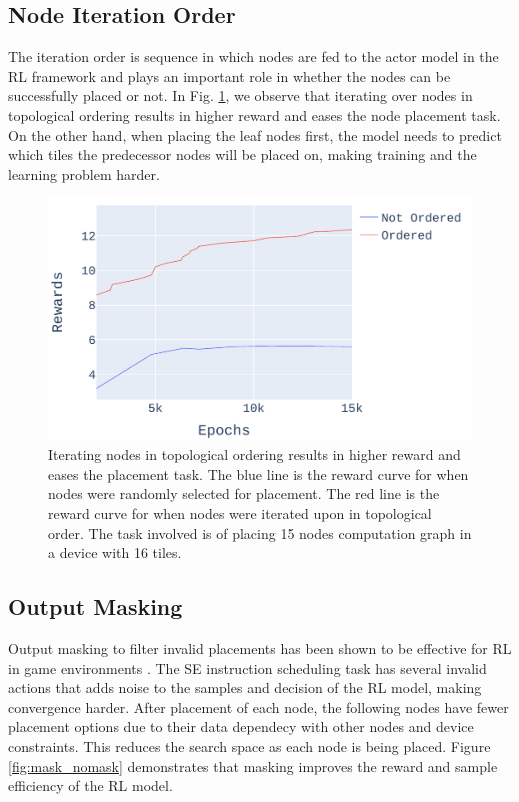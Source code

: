 \subsection{Node Iteration Order}

The iteration order is sequence in which nodes are fed to the actor model in the RL framework and plays an important role in whether the nodes can be successfully placed or not. 
In Fig. \ref{fig:ordered_placement}, we observe that iterating over nodes in topological 
ordering results in higher reward and eases the node placement task. 
On the other hand, when placing the leaf nodes first, the model needs
to predict which tiles the predecessor nodes will be placed on, making training and the learning problem harder.

\begin{figure}[h]
  \centering
  \includegraphics[width=\linewidth]{fig/plot_ordered.pdf}
  \caption{Iterating nodes in topological ordering results in higher reward and eases the placement task. 
 The blue line is the reward curve for when nodes were randomly selected for placement. The red line is the reward curve for when nodes were iterated upon in topological order. The task involved is of placing 15 nodes computation graph in a device with 16 tiles.}
  \label{fig:ordered_placement}
\end{figure}


\subsection{Output Masking}
\label{subsec:output_masking}
Output masking to filter invalid placements has been shown to be effective for RL in game environments \cite{Shengyi_mask}. 
The SE instruction scheduling task has several invalid actions that adds noise to the samples and decision of the RL model, making convergence harder. 
After placement of each node, the following nodes have fewer placement options due to their data dependecy with other nodes and device constraints.
This reduces the search space as each node is being placed. 
Figure \ref{fig:mask_nomask} demonstrates that masking improves the reward and sample efficiency of the RL model.

